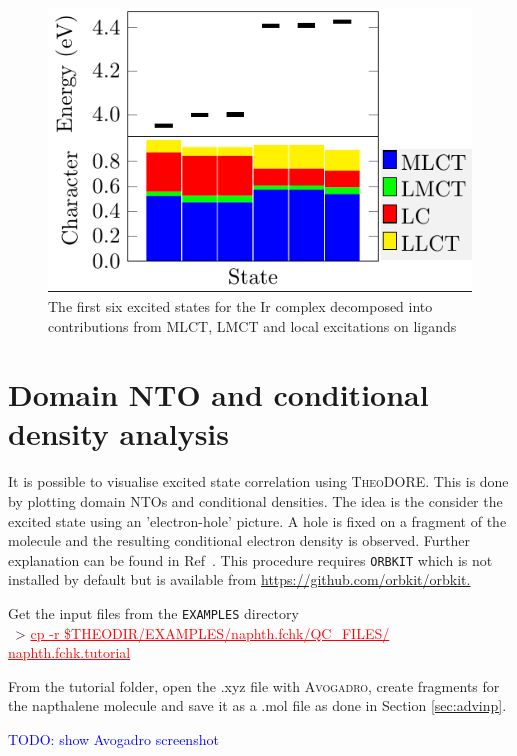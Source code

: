 \documentclass[DIV=12,headings=normal]{scrartcl}
\newcommand{\comment}[1]{\textcolor{blue}{#1}}
\newcommand{\redl}[1]{{\textcolor{red}{\underline{#1}}}}
\newcommand{\comm}[1]{
\small
~> \redl{#1}
\normalsize
}
\newcommand{\theo}{\textsc{TheoDORE}}
\begin{document}
\begin{figure}[h]
\begin{center}
\includegraphics[trim=0.0cm 0.1cm 0.0cm 0cm, clip=true, scale=1]{Om_bars.png}
\caption{The first six excited states for the Ir complex decomposed into contributions from MLCT, LMCT and local excitations on ligands}
\label{fig:ombars}
\end{center}
\end{figure}
\clearpage

\section{Domain NTO and conditional density analysis}
It is possible to visualise excited state correlation using \theo{}. This is done by plotting domain NTOs and conditional densities. The idea is the consider the excited state using an 'electron-hole' picture. A hole is fixed on a fragment of the molecule and the resulting conditional electron density is observed. Further explanation can be found in Ref~\cite{ExcCorr}. This procedure requires \texttt{ORBKIT} which is not installed by default but is available from \url{https://github.com/orbkit/orbkit.}

Get the input files from the \texttt{EXAMPLES} directory\\
\comm{cp -r \$THEODIR/EXAMPLES/naphth.fchk/QC\_FILES/ naphth.fchk.tutorial}

From the tutorial folder, open the .xyz file with \textsc{Avogadro}, create fragments for the napthalene molecule and save it as a .mol file as done in Section \ref{sec:advinp}. 

\comment{TODO: show Avogadro screenshot}
\end{document}
